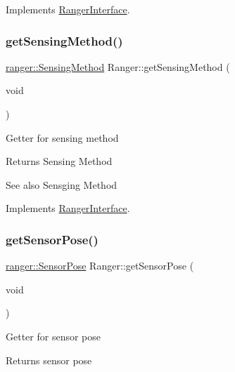 Implements \hyperlink{classRangerInterface_ae6d501ddeeaad4a7b44d7d51ce64cb88}{Ranger\+Interface}.

\mbox{\label{classRanger_a47e30b7ec55adec5bb542278ccfee140}} 
\subsubsection{\texorpdfstring{get\+Sensing\+Method()}{getSensingMethod()}}
{\footnotesize\ttfamily \hyperlink{namespaceranger_ab04465c229cc50595ffe40a891a3b135}{ranger\+::\+Sensing\+Method} Ranger\+::get\+Sensing\+Method (\begin{DoxyParamCaption}\item[{void}]{ }\end{DoxyParamCaption})\hspace{0.3cm}{\ttfamily [virtual]}}

Getter for sensing method \begin{DoxyReturn}{Returns}
Sensing Method 
\end{DoxyReturn}
\begin{DoxySeeAlso}{See also}
Sensging Method 
\end{DoxySeeAlso}


Implements \hyperlink{classRangerInterface_aeb06b9835f2b162b81917bd27797549b}{Ranger\+Interface}.

\mbox{\label{classRanger_aec1e730fbf4b46b01b08f6655152fc39}} 
\subsubsection{\texorpdfstring{get\+Sensor\+Pose()}{getSensorPose()}}
{\footnotesize\ttfamily \hyperlink{structranger_1_1SensorPose}{ranger\+::\+Sensor\+Pose} Ranger\+::get\+Sensor\+Pose (\begin{DoxyParamCaption}\item[{void}]{ }\end{DoxyParamCaption})\hspace{0.3cm}{\ttfamily [virtual]}}

Getter for sensor pose \begin{DoxyReturn}{Returns}
sensor pose 
\end{DoxyReturn}



